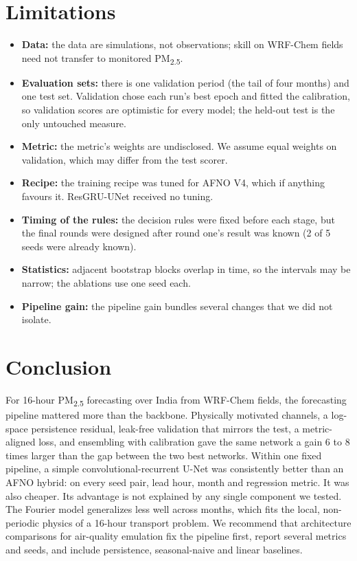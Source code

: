 \documentclass[10pt]{article}
\newcommand{\PM}{PM\textsubscript{2.5}}
\begin{document}
\section{Limitations}

\begin{itemize}[leftmargin=14pt]
\item \textbf{Data:} the data are simulations, not observations; skill on WRF-Chem fields need not transfer to monitored \PM.
\item \textbf{Evaluation sets:} there is one validation period (the tail of four months) and one test set. Validation chose each run's best epoch and fitted the calibration, so validation scores are optimistic for every model; the held-out test is the only untouched measure.
\item \textbf{Metric:} the metric's weights are undisclosed. We assume equal weights on validation, which may differ from the test scorer.
\item \textbf{Recipe:} the training recipe was tuned for AFNO V4, which if anything favours it. ResGRU-UNet received no tuning.
\item \textbf{Timing of the rules:} the decision rules were fixed before each stage, but the final rounds were designed after round one's result was known (2 of 5 seeds were already known).
\item \textbf{Statistics:} adjacent bootstrap blocks overlap in time, so the intervals may be narrow; the ablations use one seed each.
\item \textbf{Pipeline gain:} the pipeline gain bundles several changes that we did not isolate.
\end{itemize}

\section{Conclusion}

For 16-hour \PM{} forecasting over India from WRF-Chem fields, the forecasting pipeline mattered more than the backbone. Physically motivated channels, a log-space persistence residual, leak-free validation that mirrors the test, a metric-aligned loss, and ensembling with calibration gave the same network a gain 6 to 8 times larger than the gap between the two best networks. Within one fixed pipeline, a simple convolutional-recurrent U-Net was consistently better than an AFNO hybrid: on every seed pair, lead hour, month and regression metric. It was also cheaper. Its advantage is not explained by any single component we tested. The Fourier model generalizes less well across months, which fits the local, non-periodic physics of a 16-hour transport problem. We recommend that architecture comparisons for air-quality emulation fix the pipeline first, report several metrics and seeds, and include persistence, seasonal-naive and linear baselines.
\end{document}
